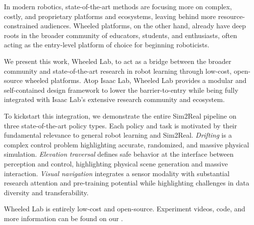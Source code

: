 In modern robotics, state-of-the-art methods are focusing more on complex, costly, and proprietary platforms and ecosystems, leaving behind more resource-constrained audiences. Wheeled platforms, on the other hand, already have deep roots in the broader community of educators, students, and enthusiasts, often acting as the entry-level platform of choice for beginning roboticists.

We present this work, Wheeled Lab, to act as a bridge between the broader community and state-of-the-art research in robot learning through low-cost, open-source wheeled platforms. Atop Isaac Lab, Wheeled Lab provides a modular and self-contained design framework to lower the barrier-to-entry while being fully integrated with Isaac Lab's extensive research community and ecosystem.

To kickstart this integration, we demonstrate the entire Sim2Real pipeline on three state-of-the-art policy types. Each policy and task is motivated by their fundamental relevance to general robot learning and Sim2Real. \textit{Drifting} is a complex control problem highlighting accurate, randomized, and massive physical simulation. \textit{Elevation traversal} defines safe behavior at the interface between perception and control, highlighting physical scene generation and massive interaction. \textit{Visual navigation} integrates a sensor modality with substantial research attention and pre-training potential while highlighting challenges in data diversity and transferability.

Wheeled Lab is entirely low-cost and open-source. Experiment videos, code, and more information can be found on our \website.

